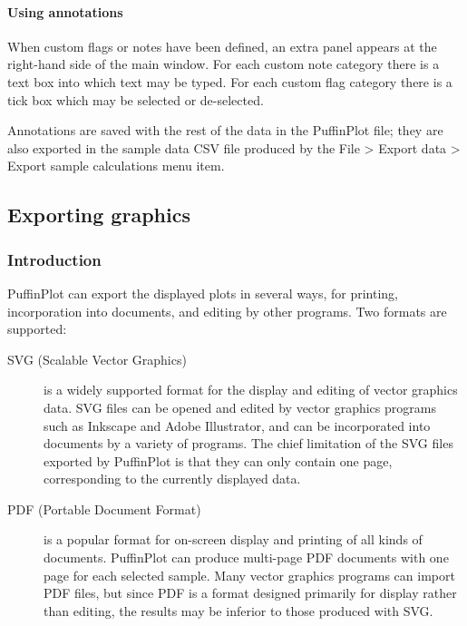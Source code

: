 \documentclass[a4paper,british]{article}
\newcommand{\ppcmd}[1]{\textsf{#1}} %
\newcommand{\caps}[1]{\MakeTextUppercase{#1}} %
\newcommand{\submenu}{ \textgreater{} } %
\begin{document}
\paragraph{Using annotations}

When custom flags or notes have been defined, an extra panel appears at the
right-hand side of the main window. For each custom note category there is a
text box into which text may be typed. For each custom flag category there is
a tick box which may be selected or de-selected.

Annotations are saved with the rest of the data in the PuffinPlot file; they
are also exported in the sample data \caps{csv} file produced by the
\ppcmd{File\submenu Export data\submenu Export sample calculations} menu
item.

\subsection{\label{sec:graphics-export}Exporting graphics}

\subsubsection{Introduction}

PuffinPlot can export the displayed plots in several ways, for printing,
incorporation into documents, and editing by other programs. Two formats are
supported:

\begin{description}

\item[SVG (Scalable Vector Graphics)] is a widely supported format for the
  display and editing of vector graphics data. SVG files can be opened and
  edited by vector graphics programs such as Inkscape and Adobe Illustrator,
  and can be incorporated into documents by a variety of programs. The chief
  limitation of the SVG files exported by PuffinPlot is that they can
  only contain one page, corresponding to the currently displayed data.

\item[PDF (Portable Document Format)] is a popular format for on-screen
  display and printing of all kinds of documents. PuffinPlot can produce
  multi-page PDF documents with one page for each selected sample.
  Many vector graphics programs can import PDF files, but since PDF is 
  a format designed primarily for display rather than editing, the results
  may be inferior to those produced with SVG.

\end{description}
\end{document}
